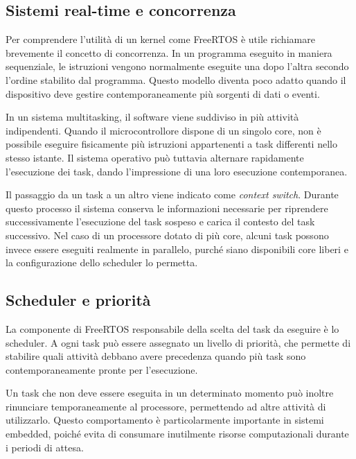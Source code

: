 \subsection{Sistemi real-time e concorrenza}
Per comprendere l'utilità di un kernel come FreeRTOS è utile richiamare
brevemente il concetto di concorrenza. In un programma eseguito in maniera
sequenziale, le istruzioni vengono normalmente eseguite una dopo l'altra
secondo l'ordine stabilito dal programma. Questo modello diventa poco adatto
quando il dispositivo deve gestire contemporaneamente più sorgenti di dati
o eventi.

\vspace{.25cm}

In un sistema multitasking, il software viene suddiviso in più attività
indipendenti. Quando il microcontrollore dispone di un singolo core, non è
possibile eseguire fisicamente più istruzioni appartenenti a task differenti
nello stesso istante. Il sistema operativo può tuttavia alternare rapidamente
l'esecuzione dei task, dando l'impressione di una loro esecuzione
contemporanea.

\vspace{.25cm}

Il passaggio da un task a un altro viene indicato come
\textit{context switch}. Durante questo processo il sistema conserva le
informazioni necessarie per riprendere successivamente l'esecuzione del
task sospeso e carica il contesto del task successivo.
Nel caso di un processore dotato di più core, alcuni task possono invece
essere eseguiti realmente in parallelo, purché siano disponibili core liberi
e la configurazione dello scheduler lo permetta.

\subsection{Scheduler e priorità}
La componente di FreeRTOS responsabile della scelta del task da eseguire è
lo scheduler. A ogni task può essere assegnato un livello di priorità, che
permette di stabilire quali attività debbano avere precedenza quando più
task sono contemporaneamente pronte per l'esecuzione.

Un task che non deve essere eseguita in un determinato momento può inoltre
rinunciare temporaneamente al processore, permettendo ad altre attività di
utilizzarlo. Questo comportamento è particolarmente importante in sistemi
embedded, poiché evita di consumare inutilmente risorse computazionali
durante i periodi di attesa.

